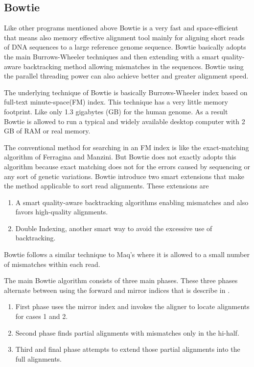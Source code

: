 \documentclass{standalone}
\begin{document}
\subsection{Bowtie}
Like other programs mentioned above Bowtie\cite{bowtie} is a very fast and space-efficient that means also memory effective alignment tool mainly for aligning short reads of DNA sequences to a large reference genome sequence. Bowtie basically adopts the main Burrows-Wheeler techniques and then extending with a smart quality-aware backtracking method allowing mismatches in the sequences. Bowtie using the parallel threading power can also achieve better and greater alignment speed.
\par 
The underlying technique of Bowtie is basically Burrows-Wheeler index based on full-text minute-space(FM) index\cite{fm_index}. This technique has a very little memory footprint. Like only 1.3 gigabytes (GB) for the human genome. As a result Bowtie is allowed to run a typical and widely available desktop computer with 2 GB of RAM or real memory.
\par 
The conventional method for searching in an FM index is like the exact-matching algorithm of Ferragina and Manzini\cite{fm_index}. But Bowtie does not exactly adopts this algorithm because exact matching does not for the errors caused by sequencing or any sort of genetic variations. Bowtie introduce two smart extensions that make the method applicable to sort read alignments. These extensions are
\begin{enumerate}
	\item A smart quality-aware backtracking algorithms enabling mismatches and also favors high-quality alignments.
	\item Double Indexing, another smart way to avoid the excessive use of backtracking.
\end{enumerate}
Bowtie follows a similar technique to Maq's\cite{mapLi} where it is allowed to a small number of mismatches within each read.
\par 
The main Bowtie algorithm consists of three main phases. These three phases alternate between  using the forward and mirror indices that is describe in \cite{bowtie}.
\begin{enumerate}
	\item First phase uses the mirror index and invokes the aligner to locate alignments for cases 1 and 2.
	\item Second phase finds partial alignments with mismatches only in the hi-half.
	\item Third and final phase attempts to extend those partial alignments into the full alignments.
\end{enumerate}
\end{document}
